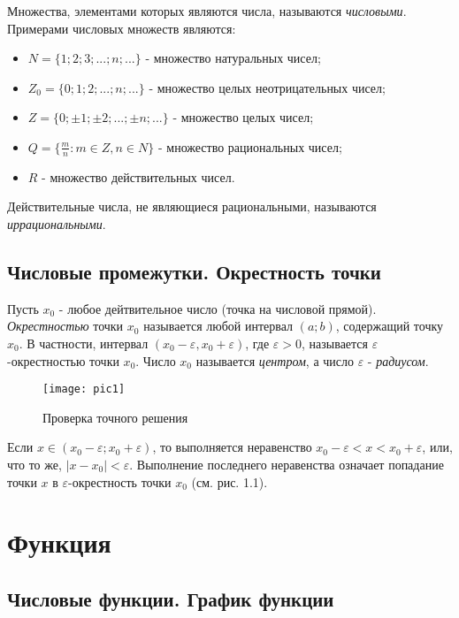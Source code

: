 \documentclass[14pt]{extreport}
\begin{document}
Множества, элементами которых являются числа, называются \emph{числовыми}. Примерами числовых множеств являются:
\begin{itemize}
\item $N = \{1; 2; 3; ...; n; ...\}$ - множество натуральных чисел;
\item $Z_0 = \{0; 1; 2; ...; n; ...\}$ - множество целых неотрицательных чисел;
\item $Z = \{0; \pm 1; \pm 2; ...; \pm n; ...\}$ - множество целых чисел;
\item $Q = \{\frac mn : m \in Z, n \in N\}$ - множество рациональных чисел;
\item $R$ - множество действительных чисел.
\end{itemize} 

Действительные числа, не являющиеся рациональными, называются \emph{иррациональными}.



\section{Числовые промежутки. Окрестность точки}

Пусть $x_0$ - любое дейтвительное число (точка на числовой прямой). \emph{Окрестностью} точки $x_0$ называется любой интервал $(a; b)$, содержащий точку $x_0$. В частности, интервал $(x_0 - \varepsilon, x_0 + \varepsilon)$, где $\varepsilon > 0$, называется $\varepsilon$-окрестностью точки $x_0$. Число $x_0$ называется \emph{центром}, а число $\varepsilon$ - \emph{радиусом}.

\begin{figure}[H]
\centerline{\texttt{[image: pic1]}}
\caption{Проверка точного решения}
\label{fig11}
\end{figure}

Если $x \in (x_0 - \varepsilon; x_0 + \varepsilon)$, то выполняется неравенство $x_0 - \varepsilon < x < x_0 + \varepsilon$, или, что то же, $|x - x_0| < \varepsilon$. Выполнение последнего неравенства означает попадание точки $x$ в $\varepsilon$-окрестность точки $x_0$ (см. рис. 1.1).






\chapter{Функция}

\section{Числовые функции. График функции}
\end{document}
